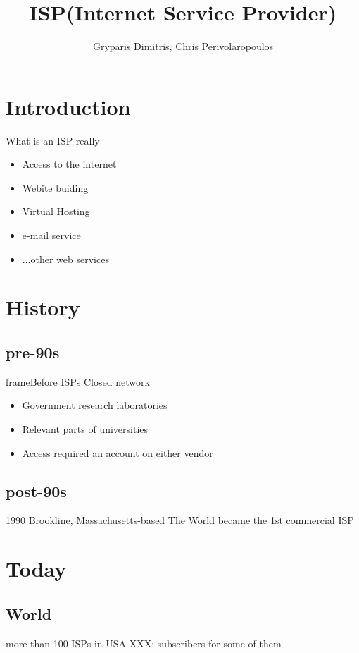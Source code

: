 \documentclass[arial,pdftex]{beamer}
\title{ISP(Internet Service Provider)}
\subtitle{}
\author{Gryparis Dimitris, Chris Perivolaropoulos}
\begin{document}
\section{Introduction}
\frame{\titlepage}

\begin{frame}{What is an ISP really}
  \begin{itemize}
  \item Access to the internet
  \item Webite buiding
  \item Virtual Hosting
  \item e-mail service
  \item ...other web services
  \end{itemize}
\end{frame}


\section{History}

\subsection{pre-90s}
\begin{frame}frame{Before ISPs}
  Closed network
  \begin{itemize}
  \item Government research laboratories
  \item Relevant parts of universities
  \item Access required an account on either vendor
  \end{itemize}
\end{frame}

\subsection{post-90s}
\begin{frame}
  1990 Brookline, Massachusetts-based The World became the 1st
  commercial ISP
\end{frame}

\section{Today}
\subsection{World}
\begin{frame}{more than 100 ISPs in USA}
  XXX: subscribers for some of them
\end{frame}
\end{document}
